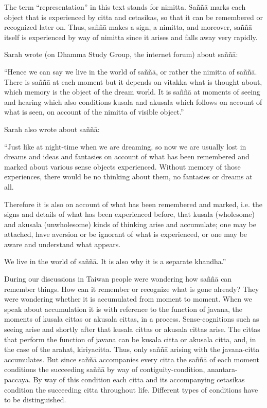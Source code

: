 \documentclass{book}
\begin{document}
The term ``representation'' in this text
stands for nimitta. Saññā marks each object that is experienced by citta
and cetasikas, so that it can be remembered or recognized later on.
Thus, saññā makes a sign, a nimitta, and moreover, saññā itself is
experienced by way of nimitta since it arises and falls away very
rapidly. 

Sarah wrote
(on Dhamma Study Group, the internet
forum) about saññā:

``Hence we can say we live in the
world of saññā, or rather
the nimitta of saññā. There
is saññā at each moment
but it depends on vitakka what is thought about, which memory is the
object of the dream world. It is saññā
at moments of seeing and hearing
which also conditions kusala and akusala which follows on account of
what is seen, on account of the nimitta of visible
object.''

Sarah also wrote about saññā: 

``Just like at night-time when we are
dreaming, so now we are usually
lost in dreams and ideas and
fantasies on account of what has been remembered and marked about
various sense objects experienced. Without memory of those experiences,
there would be no thinking about them, no fantasies or dreams at all.

Therefore it is also on account of what
has been remembered and marked, i.e. the signs and details of what has
been experienced before, that kusala (wholesome) and akusala
(unwholesome) kinds of thinking arise and accumulate;
one may be attached,
have aversion or
be ignorant of what is
experienced, or one may be
aware and understand what appears. 

We live in
the world of saññā. It is also why
it is a separate
khandha.''

During our discussions in Taiwan people were wondering how
saññā can remember things. How can it remember or recognize what is gone
already? They were wondering whether it is accumulated from moment to
moment. When we speak about accumulation it is with reference to the
function of javana, the moments of kusala cittas or akusala cittas, in a
process. Sense-cognitions such as seeing arise and shortly after that
kusala cittas or akusala cittas arise. The cittas that perform the
function of javana can be kusala citta or akusala citta, and, in the
case of the arahat, kiriyacitta. Thus, only saññā arising with the
javana-citta accumulates. But since saññā accompanies every citta the
saññā of each moment conditions the succeeding saññā by way of
contiguity-condition, anantara-paccaya. By way of this condition each
citta and its accompanying cetasikas condition the succeeding citta
throughout life. Different types of conditions have to be
distinguished.
\end{document}
